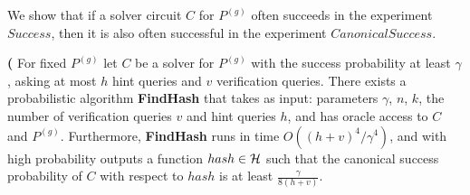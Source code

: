 We show that if a solver circuit $C$ for $P^{(g)}$ often succeeds in the experiment $Success$, then it is
also often successful in the experiment $CanonicalSuccess$.

\begin{lemma}\textbf{(}
\label{lemma:hash_function_probability}
For fixed $P^{(g)}$ let $C$ be a solver for $P^{(g)}$ with the success probability at least $\gamma$,
asking at most $h$ hint queries and $v$ verification queries.
There exists a probabilistic algorithm \textbf{FindHash} that takes as input:
parameters $\gamma$, $n$, $k$, the number of verification queries $v$ and hint queries $h$, and has
oracle access to $C$ and $P^{(g)}$. Furthermore, \textbf{FindHash} runs in time $O((h+v)^4/\gamma^4)$,
and with high probability outputs a function $hash \in \mathcal{H}$
such that the canonical success probability of $C$ with respect to $hash$ is at least $\frac{\gamma}{8(h+v)}$.
\end{lemma}
%

